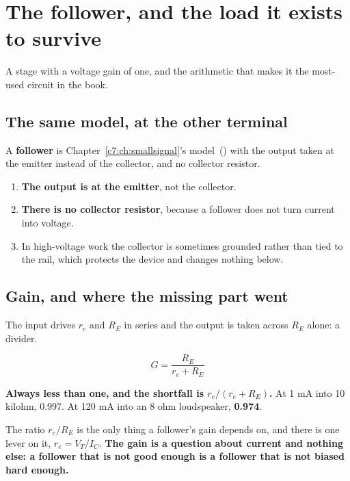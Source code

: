 
\section{The follower, and the load it exists to survive}
\label{c8:app:a}

A stage with a voltage gain of one, and the arithmetic that makes it the most-used circuit in the book.

\subsection{The same model, at the other terminal}
\label{c8:sec:a1}
A \textbf{follower} is Chapter~\ref{c7:ch:smallsignal}'s model~() with the output taken at the emitter instead of the collector, and no collector resistor.


\begin{enumerate}
  \item \textbf{The output is at the emitter}, not the collector.
  \item \textbf{There is no collector resistor}, because a follower does not turn current into voltage.
  \item In high-voltage work the collector is sometimes grounded rather than tied to the rail, which protects the device and changes nothing below.
\end{enumerate}

\subsection{Gain, and where the missing part went}
\label{c8:sec:a2}
The input drives $r_e$ and $R_E$ in series and the output is taken across $R_E$ alone: a divider.

\[
  G = \frac{R_E}{r_e + R_E}
\]

\textbf{Always less than one, and the shortfall is $r_e/(r_e + R_E)$.} At 1 mA into 10 kilohm, 0.997. At 120 mA into an 8 ohm loudspeaker, \textbf{0.974}.

The ratio $r_e/R_E$ is the only thing a follower's gain depends on, and there is one lever on it, $r_e = V_T/I_C$. \textbf{The gain is a question about current and nothing else: a follower that is not good enough is a follower that is not biased hard enough.}

